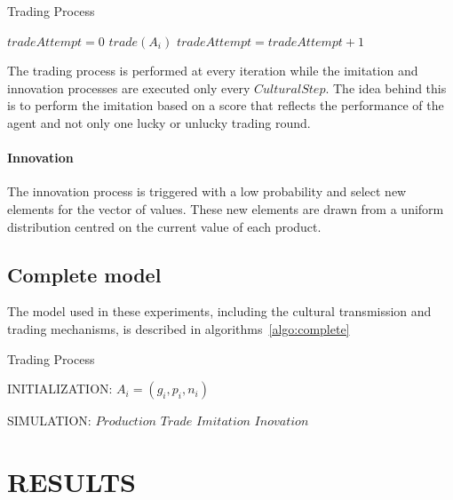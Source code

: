 \documentclass{wscpaperproc}
\begin{document}
\begin{algorithm}
\caption{Trading Process}
\label{algo:trade}
	\begin{algorithmic}[1]
	\scriptsize
			\State $tradeAttempt = 0$
					\State $trade(A_i)$
				\Else
					\State $tradeAttempt = tradeAttempt + 1$					
				\EndIf
			\EndFor
		\EndFor
\end{algorithmic}
\end{algorithm}

The trading process is performed at every iteration while the imitation and innovation processes are executed only every $CulturalStep$. The idea behind this is to perform the imitation based on a score that reflects the performance of the agent and not only one lucky or unlucky trading round.

\paragraph{Innovation} The innovation process is triggered with a low probability and select new elements for the vector of values. These new elements are drawn from a uniform distribution centred on the current value of each product.

\subsection{Complete model}

The model used in these experiments, including the cultural transmission and trading mechanisms, is described in algorithms~\ref{algo:complete}

\begin{algorithm}
\caption{Trading Process}
\label{algo:complete}
	\begin{algorithmic}[1]
	\scriptsize
	\State INITIALIZATION: 
				\State $A_i = (g_i,p_i,n_i)$
			\EndFor
		\EndFor

	\State SIMULATION:
				\State $Production$
				\State $Trade$				
					\State $Imitation$
					\State $Inovation$
				\EndIf
			\EndFor
		\EndLoop
\end{algorithmic}
\end{algorithm}


\section{RESULTS}
\end{document}

